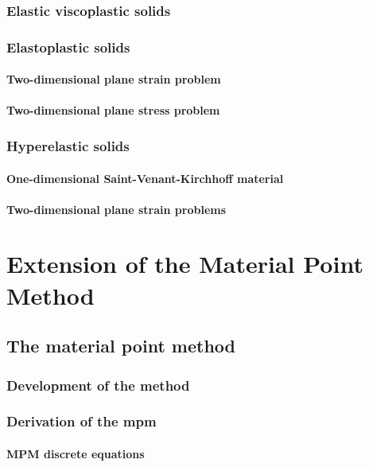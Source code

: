 \documentclass[10pt,a4paper]{report}
\begin{document}
	        \subsection{Elastic viscoplastic solids}
            \subsection{Elastoplastic solids}
	            \subsubsection{Two-dimensional plane strain problem}
                \subsubsection{Two-dimensional plane stress problem}

            \subsection{Hyperelastic solids}
	            \subsubsection{One-dimensional Saint-Venant-Kirchhoff material}
                \subsubsection{Two-dimensional plane strain problems}

                                   
	\chapter{Extension of the Material Point Method}
		
		\section{The material point method}
		    \subsection{Development of the method}
			\subsection{Derivation of the mpm}
	            \subsubsection{MPM discrete equations}
\end{document}
